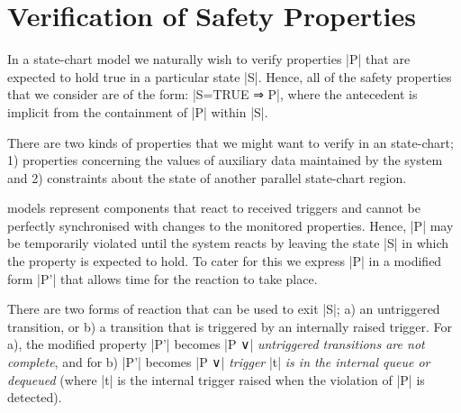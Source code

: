 

\section{Verification of Safety Properties}
\label{sec:verificationSafety}

In a state-chart model we naturally wish to verify properties |P| that are expected to hold true in a particular state |S|.
Hence, all of the safety properties that we consider are of the form: |S=TRUE ⇒ P|, where the antecedent is implicit from the containment of |P| within |S|.

There are two kinds of properties that we might want to verify in an \SCXML state-chart;
1) properties concerning the values of auxiliary data maintained by the system and 
2) constraints about the state of another parallel state-chart region.

\SCXML models represent components that react to received triggers and cannot be perfectly synchronised with changes to the monitored properties. 
Hence, |P| may be temporarily violated until the system reacts by leaving the state |S| in which the property is expected to hold.
To cater for this we express |P| in a modified form |P'| that allows time for the reaction to take place.

There are two forms of reaction that can be used to exit |S|; 
a) an untriggered transition, or 
b) a transition that is triggered by an internally raised trigger.
For a), the modified property |P'| becomes |P ∨| \emph{untriggered transitions are not complete}, 
and for b) |P'| becomes |P ∨| \emph{trigger} |t| \emph{is in the internal queue or dequeued}
(where |t| is the internal trigger raised when the violation of |P| is detected).


